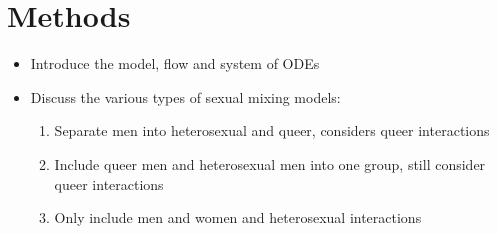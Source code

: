 \documentclass[12pt]{article}
\begin{document}
\section{Methods}
\begin{itemize}
\item Introduce the model, flow and system of ODEs
\item Discuss the various types of sexual mixing models:
	\begin{enumerate}
	\item Separate men into heterosexual and queer, considers queer interactions
	\item Include queer men and heterosexual men into one group, still consider queer interactions 
	\item Only include men and women and heterosexual interactions
	\end{enumerate}	
\end{itemize}
\end{document}
